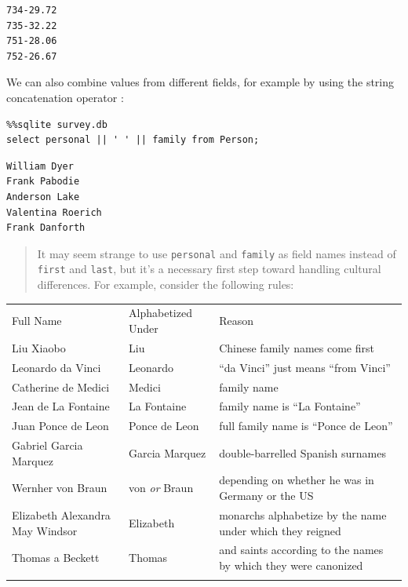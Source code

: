 \documentclass[]{book}
\begin{document}
\begin{verbatim}
734-29.72
735-32.22
751-28.06
752-26.67
\end{verbatim}

We can also combine values from different fields, for example by using
the string concatenation operator \texttt{\textbar{}\textbar{}}:

\begin{verbatim}
%%sqlite survey.db
select personal || ' ' || family from Person;
\end{verbatim}

\begin{verbatim}
William Dyer
Frank Pabodie
Anderson Lake
Valentina Roerich
Frank Danforth
\end{verbatim}

\begin{quote}
It may seem strange to use \texttt{personal} and \texttt{family} as
field names instead of \texttt{first} and \texttt{last}, but it's a
necessary first step toward handling cultural differences. For example,
consider the following rules:
\end{quote}

\begin{longtable}[c]{@{}lll@{}}
\hline\noalign{\medskip}
Full Name & Alphabetized Under & Reason
\\\noalign{\medskip}
\hline\noalign{\medskip}
Liu Xiaobo & Liu & Chinese family names come first
\\\noalign{\medskip}
Leonardo da Vinci & Leonardo & ``da Vinci'' just means ``from Vinci''
\\\noalign{\medskip}
Catherine de Medici & Medici & family name
\\\noalign{\medskip}
Jean de La Fontaine & La Fontaine & family name is ``La Fontaine''
\\\noalign{\medskip}
Juan Ponce de Leon & Ponce de Leon & full family name is ``Ponce de
Leon''
\\\noalign{\medskip}
Gabriel Garcia Marquez & Garcia Marquez & double-barrelled Spanish
surnames
\\\noalign{\medskip}
Wernher von Braun & von \emph{or} Braun & depending on whether he was in
Germany or the US
\\\noalign{\medskip}
Elizabeth Alexandra May Windsor & Elizabeth & monarchs alphabetize by
the name under which they reigned
\\\noalign{\medskip}
Thomas a Beckett & Thomas & and saints according to the names by which
they were canonized
\\\noalign{\medskip}
\hline
\end{longtable}
\end{document}
